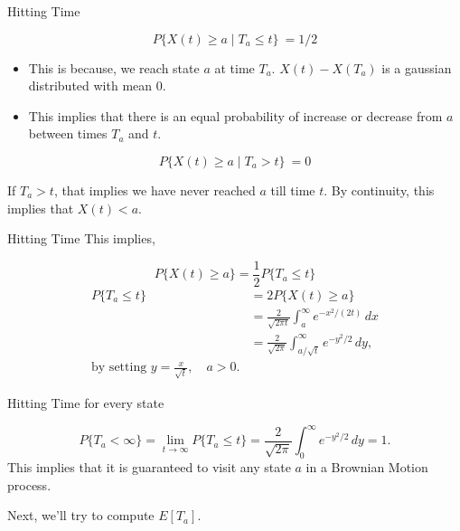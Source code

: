 \documentclass{beamer}
\begin{document}
    \begin{frame}{Hitting Time}
    \begin{center}
    \[
        P\{X(t)\ge a \mid T_a \le t\}\ = 1/2
    \]

    \end{center}

    \begin{itemize}
        \item This is because, we reach state $a$ at time $T_a$. $X(t)-X(T_a)$ is a gaussian distributed with mean 0.
        \item This implies that there is an equal probability of increase or decrease from $a$ between times $T_a$ and $t$.
    \end{itemize}

    \begin{center}
    \[
        P\{X(t)\ge a \mid T_a > t\}\ = 0
    \]

    If $T_a > t$, that implies we have never reached $a$ till time $t$. By continuity, this implies that $X(t)<a$. 

    \end{center}
    
		
	\end{frame}

    \begin{frame}{Hitting Time}
        This implies, 
        \begin{center}
            \[
            P\{X(t)\ge a\} = \frac{1}{2}P\{T_a \le t\}
            \]
            \[
            \begin{aligned}
            P\{T_a \le t\} &= 2P\{X(t)\ge a\} \\
            &= \frac{2}{\sqrt{2\pi t}} \int_a^\infty e^{-x^2/(2t)}\,dx \\
            &= \frac{2}{\sqrt{2\pi}} \int_{a/\sqrt{t}}^\infty e^{-y^2/2}\,dy,
            \\ \text{by setting } y=\frac{x}{\sqrt{t}}, \quad a>0.
            \end{aligned}
            \]
        \end{center}
    \end{frame}


    \begin{frame}{Hitting Time for every state}
        \begin{center}
            \[
            P\{T_a < \infty\}
            =
            \lim_{t\to\infty} P\{T_a \le t\}
            =
            \frac{2}{\sqrt{2\pi}} \int_0^\infty e^{-y^2/2}\,dy
            =
            1.
            \]
            This implies that it is guaranteed to visit any state $a$ in a Brownian Motion process.
        \end{center}

        Next, we'll try to compute $E[T_a]$.
    \end{frame}
\end{document}
